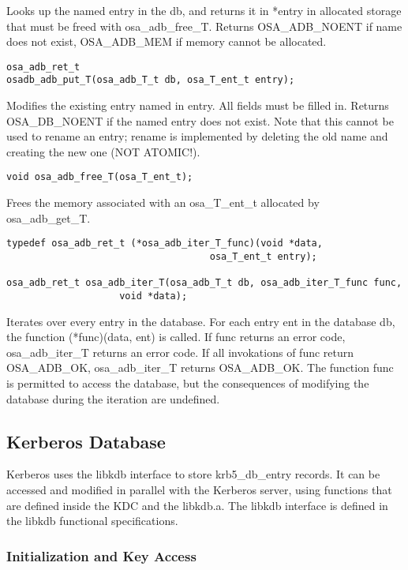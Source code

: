 Looks up the named entry in the db, and returns it in *entry in
allocated storage that must be freed with osa_adb_free_T.  Returns
OSA_ADB_NOENT if name does not exist, OSA_ADB_MEM if memory cannot be
allocated.

\begin{verbatim}
osa_adb_ret_t
osadb_adb_put_T(osa_adb_T_t db, osa_T_ent_t entry);
\end{verbatim}

Modifies the existing entry named in entry.  All fields must be filled
in.  Returns OSA_DB_NOENT if the named entry does not exist.  Note
that this cannot be used to rename an entry; rename is implemented by
deleting the old name and creating the new one (NOT ATOMIC!).

\begin{verbatim}
void osa_adb_free_T(osa_T_ent_t);
\end{verbatim}

Frees the memory associated with an osa_T_ent_t allocated by
osa_adb_get_T.

\begin{verbatim}
typedef osa_adb_ret_t (*osa_adb_iter_T_func)(void *data,
                                    osa_T_ent_t entry);

osa_adb_ret_t osa_adb_iter_T(osa_adb_T_t db, osa_adb_iter_T_func func, 
                    void *data);
\end{verbatim}

Iterates over every entry in the database.  For each entry ent in the
database db, the function (*func)(data, ent) is called.  If func
returns an error code, osa_adb_iter_T returns an error code.  If all
invokations of func return OSA_ADB_OK, osa_adb_iter_T returns
OSA_ADB_OK.  The function func is permitted to access the database,
but the consequences of modifying the database during the iteration
are undefined.

\subsection{Kerberos Database}

Kerberos uses the libkdb interface to store krb5_db_entry records.  It
can be accessed and modified in parallel with the Kerberos server,
using functions that are defined inside the KDC and the libkdb.a.  The
libkdb interface is defined in the libkdb functional specifications.

\subsubsection{Initialization and Key Access}


